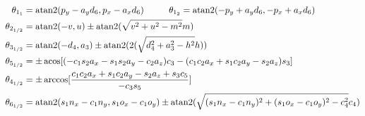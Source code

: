 
\begin{subequations}\label{eq:BackKinEquations_shortIntext}
	\begin{align}
			\theta_{1_1} &= \operatorname{atan2} ( p_y - a_y d_6 , p_x - a_x d_6) 
		\phantom{..........}
		\theta_{1_2} = \operatorname{atan2} (-p_y + a_y d_6 ,-p_x + a_x d_6) \label{eq:BackKinEquations_shortIntext_1} \\
		\theta_{2_{1/2}} &= \operatorname{atan2} (-v , u)\pm \operatorname{atan2}(\sqrt{v^2 +u^2 - m^2 } m) \\
		\theta_{3_{1/2}} &= \operatorname{atan2}(-d_4 , a_3) \pm \operatorname{atan2} (2 (\sqrt{d_4^2 +a_3^2 -h^2} h)) \\
		\theta_{5_{1/2}} &= \pm \operatorname{acos} [ ( -c_1 s_2 a_x - s_1 s_2 a_y - c_2 a_z) c_3 - (c_1 c_2 a_x + s_1 c_2 a_y - s_2 a_z) s_3] \\
		\theta_{4_{1/2}} &= \pm \arccos [ \frac{ c_1 c_2 a_x + s_1 c_2 a_y - s_2 a_z + s_3 c_5}{-c_3 s_5}] \\
		\theta_{6_{1/2}} &= \operatorname{atan2}(s_1 n_x -c_1 n_y , s_1 o_x -c_1 o_y) \pm \operatorname{atan2}(\sqrt{(s_1 n_x - c_1 n_y)^2 + (s_1 o_x - c_1 o_y )^2 - c_4^2}  c_4) 
	\end{align}
\end{subequations}





